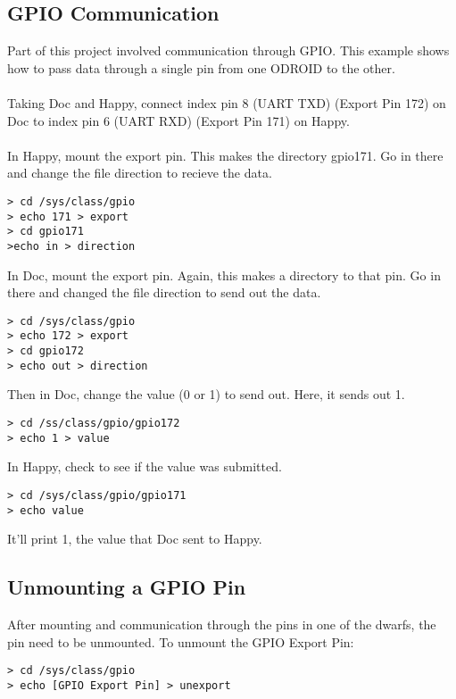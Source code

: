 \subsection{GPIO Communication}
Part of this project involved communication through GPIO. This example shows how to pass data through a single pin from one ODROID to the other. \\ \\
Taking Doc and Happy, connect index pin 8 (UART TXD) (Export Pin 172) on Doc to index pin 6 (UART RXD) (Export Pin 171) on Happy. \\ \\
In Happy, mount the export pin. This makes the directory gpio171. Go in there and change the file direction to recieve the data.
\begin{lstlisting}
> cd /sys/class/gpio
> echo 171 > export
> cd gpio171
>echo in > direction
\end{lstlisting}
In Doc, mount the export pin. Again, this makes a directory to that pin. Go in there and changed the file direction to send out the data.
\begin{lstlisting}
> cd /sys/class/gpio 
> echo 172 > export 
> cd gpio172 
> echo out > direction
\end{lstlisting}
Then in Doc, change the value (0 or 1) to send out. Here, it sends out 1.
\begin{lstlisting}
> cd /ss/class/gpio/gpio172
> echo 1 > value
\end{lstlisting}
In Happy, check to see if the value was submitted.
\begin{lstlisting}
> cd /sys/class/gpio/gpio171
> echo value
\end{lstlisting}
It'll print 1, the value that Doc sent to Happy.

\subsection{Unmounting a GPIO Pin}
After mounting and communication through the pins in one of the dwarfs, the pin need to be unmounted. To unmount the GPIO Export Pin:
\begin{lstlisting}
> cd /sys/class/gpio
> echo [GPIO Export Pin] > unexport
\end{lstlisting}

